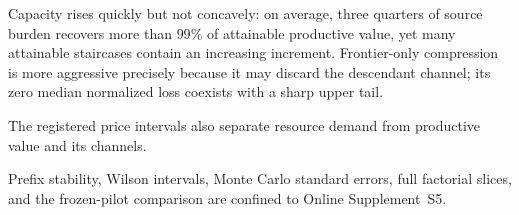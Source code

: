 Capacity rises quickly but not concavely: on average, three quarters of source
burden recovers more than $99\%$ of attainable productive value, yet many
attainable staircases contain an increasing increment.
Frontier-only compression is more aggressive precisely because it may discard
the descendant channel; its zero median normalized loss coexists with a sharp
upper tail.

The registered price intervals also separate resource demand from productive
value and its channels.
\begin{table}[htbp]
\centering
\scriptsize

\caption{Across-trial mean arc elasticities and channel contributions; every
entry is dimensionless.  Exact \(\mathtt{Rational\{BigInt\}}\) observations
are rounded to five decimal places for display.  Every arc is defined in all
1,024 trials, so no undefined elasticity is imputed as zero.  The two channel
contributions add exactly to productive-value elasticity before rendering.}
\label{tab:randomized-price-elasticities}
\end{table}
Prefix stability, Wilson intervals, Monte Carlo standard errors, full
factorial slices, and the frozen-pilot comparison are confined to Online
Supplement~S5.
